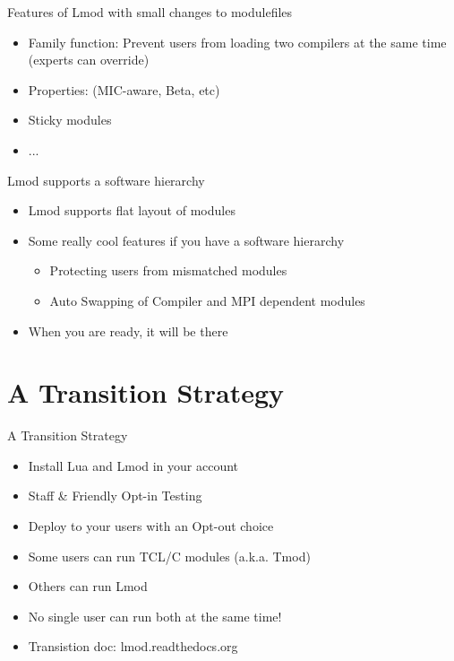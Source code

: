 \documentclass{beamer}
\begin{document}
\begin{frame}{Features of Lmod with small changes to modulefiles}
  \begin{itemize}
    \item Family function: Prevent users from loading two compilers at
      the same time (experts can override)
    \item Properties: (MIC-aware, Beta, etc)
    \item Sticky modules
    \item ...
  \end{itemize}
\end{frame}

\begin{frame}{Lmod supports a software hierarchy}
  \begin{itemize}
    \item Lmod supports flat layout of modules
    \item Some really cool features if you have a software hierarchy
      \begin{itemize}
        \item Protecting users from mismatched modules
        \item Auto Swapping of Compiler and MPI dependent modules
      \end{itemize}
    \item When you are ready, it will be there
  \end{itemize}
\end{frame}

\section{A Transition Strategy}

\begin{frame}{A Transition Strategy}
  \begin{itemize}
    \item Install Lua and Lmod in your account
    \item Staff \& Friendly Opt-in Testing
    \item Deploy to your users with an Opt-out choice
    \item Some users can run TCL/C modules (a.k.a. Tmod)
    \item Others can run Lmod
    \item No single user can run both at the same time!
    \item Transistion doc: lmod.readthedocs.org
  \end{itemize}
\end{frame}
\end{document}
